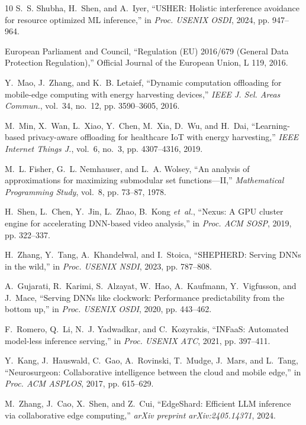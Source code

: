 \documentclass[journal]{IEEEtran}
\begin{document}
\begin{thebibliography}{10}
S.~S. Shubha, H.~Shen, and A.~Iyer, ``{USHER}: Holistic interference avoidance
  for resource optimized {ML} inference,'' in \emph{Proc. USENIX OSDI}, 2024,
  pp. 947--964.

{European Parliament and Council}, ``Regulation ({EU}) 2016/679 ({General Data
  Protection Regulation}),'' Official Journal of the European Union, L 119,
  2016.

Y.~Mao, J.~Zhang, and K.~B. Letaief, ``Dynamic computation offloading for
  mobile-edge computing with energy harvesting devices,'' \emph{IEEE J. Sel.
  Areas Commun.}, vol.~34, no.~12, pp. 3590--3605, 2016.

M.~Min, X.~Wan, L.~Xiao, Y.~Chen, M.~Xia, D.~Wu, and H.~Dai, ``Learning-based
  privacy-aware offloading for healthcare {IoT} with energy harvesting,''
  \emph{IEEE Internet Things J.}, vol.~6, no.~3, pp. 4307--4316, 2019.

M.~L. Fisher, G.~L. Nemhauser, and L.~A. Wolsey, ``An analysis of
  approximations for maximizing submodular set functions---{II},''
  \emph{Mathematical Programming Study}, vol.~8, pp. 73--87, 1978.

H.~Shen, L.~Chen, Y.~Jin, L.~Zhao, B.~Kong \emph{et~al.}, ``Nexus: A {GPU}
  cluster engine for accelerating {DNN}-based video analysis,'' in \emph{Proc.
  ACM SOSP}, 2019, pp. 322--337.

H.~Zhang, Y.~Tang, A.~Khandelwal, and I.~Stoica, ``{SHEPHERD}: Serving {DNNs}
  in the wild,'' in \emph{Proc. USENIX NSDI}, 2023, pp. 787--808.

A.~Gujarati, R.~Karimi, S.~Alzayat, W.~Hao, A.~Kaufmann, Y.~Vigfusson, and
  J.~Mace, ``Serving {DNNs} like clockwork: Performance predictability from the
  bottom up,'' in \emph{Proc. USENIX OSDI}, 2020, pp. 443--462.

F.~Romero, Q.~Li, N.~J. Yadwadkar, and C.~Kozyrakis, ``{INFaaS}: Automated
  model-less inference serving,'' in \emph{Proc. USENIX ATC}, 2021, pp.
  397--411.

Y.~Kang, J.~Hauswald, C.~Gao, A.~Rovinski, T.~Mudge, J.~Mars, and L.~Tang,
  ``Neurosurgeon: Collaborative intelligence between the cloud and mobile
  edge,'' in \emph{Proc. ACM ASPLOS}, 2017, pp. 615--629.

M.~Zhang, J.~Cao, X.~Shen, and Z.~Cui, ``{EdgeShard}: Efficient {LLM} inference
  via collaborative edge computing,'' \emph{arXiv preprint arXiv:2405.14371},
  2024.


\end{thebibliography}
\end{document}
